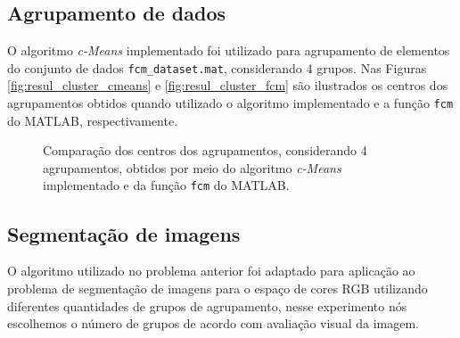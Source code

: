 \documentclass[12pt,a4paper]{article}
\numberwithin{equation}{section}
\begin{document}
\subsection{Agrupamento de dados}

O algoritmo \textit{c-Means} implementado foi utilizado para agrupamento de elementos do conjunto de dados \texttt{fcm\_dataset.mat}, considerando 4 grupos. Nas Figuras \ref{fig:resul_cluster_cmeans} e \ref{fig:resul_cluster_fcm} são ilustrados os centros dos agrupamentos obtidos quando utilizado o algoritmo implementado e a função \texttt{fcm} do MATLAB, respectivamente.

\begin{figure}[!htbp]
	\centering
	\caption{Comparação dos centros dos agrupamentos, considerando 4 agrupamentos, obtidos por meio do algoritmo \textit{c-Means} implementado e da função \texttt{fcm} do MATLAB.}
\end{figure}

\subsection{Segmentação de imagens}
\label{subsection:seg}

O algoritmo utilizado no problema anterior foi adaptado para aplicação ao problema de segmentação de imagens para o espaço de cores RGB utilizando diferentes quantidades de grupos de agrupamento, nesse experimento nós escolhemos o número de grupos de acordo com avaliação visual da imagem.
\end{document}

